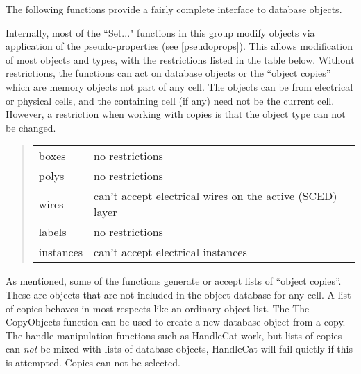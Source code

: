 The following functions provide a fairly complete interface to
database objects.

Internally, most of the ``{\vt Set}..." functions in this group modify
objects via application of the pseudo-properties (see
\ref{pseudoprops}).  This allows modification of most objects and
types, with the restrictions listed in the table below.  Without
restrictions, the functions can act on database objects or the
``object copies'' which are memory objects not part of any cell.  The
objects can be from electrical or physical cells, and the containing
cell (if any) need not be the current cell.  However, a restriction
when working with copies is that the object type can not be changed.

\begin{quote}
\begin{tabular}{lp{4in}}
boxes & no restrictions\\
polys & no restrictions\\
wires & can't accept electrical wires on the active (SCED) layer\\
labels & no restrictions\\
instances & can't accept electrical instances\\
\end{tabular}
\end{quote}

As mentioned, some of the functions generate or accept lists of
``object copies''.  These are objects that are not included in the
object database for any cell.  A list of copies behaves in most
respects like an ordinary object list.  The The {\vt CopyObjects}
function can be used to create a new database object from a copy.  The
handle manipulation functions such as {\vt HandleCat} work, but lists
of copies can {\it not} be mixed with lists of database objects, {\vt
HandleCat} will fail quietly if this is attempted.  Copies can not be
selected.

